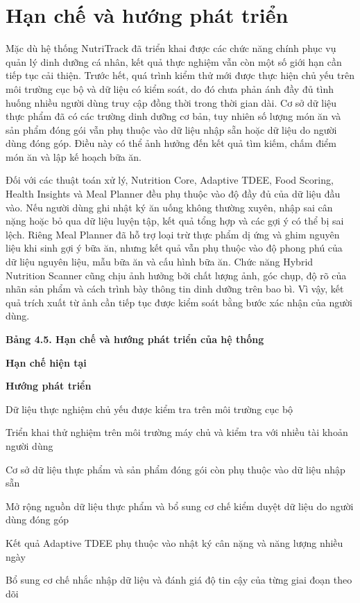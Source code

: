 \documentclass[12pt, a4paper]{report}
\begin{document}
\section{Hạn chế và hướng phát triển}Mặc dù hệ thống NutriTrack đã triển khai được các chức năng chính phục vụ quản lý dinh dưỡng cá nhân, kết quả thực nghiệm vẫn còn một số giới hạn cần tiếp tục cải thiện. Trước hết, quá trình kiểm thử mới được thực hiện chủ yếu trên môi trường cục bộ và dữ liệu có kiểm soát, do đó chưa phản ánh đầy đủ tình huống nhiều người dùng truy cập đồng thời trong thời gian dài. Cơ sở dữ liệu thực phẩm đã có các trường dinh dưỡng cơ bản, tuy nhiên số lượng món ăn và sản phẩm đóng gói vẫn phụ thuộc vào dữ liệu nhập sẵn hoặc dữ liệu do người dùng đóng góp. Điều này có thể ảnh hưởng đến kết quả tìm kiếm, chấm điểm món ăn và lập kế hoạch bữa ăn.

Đối với các thuật toán xử lý, Nutrition Core, Adaptive TDEE, Food Scoring, Health Insights và Meal Planner đều phụ thuộc vào độ đầy đủ của dữ liệu đầu vào. Nếu người dùng ghi nhật ký ăn uống không thường xuyên, nhập sai cân nặng hoặc bỏ qua dữ liệu luyện tập, kết quả tổng hợp và các gợi ý có thể bị sai lệch. Riêng Meal Planner đã hỗ trợ loại trừ thực phẩm dị ứng và ghim nguyên liệu khi sinh gợi ý bữa ăn, nhưng kết quả vẫn phụ thuộc vào độ phong phú của dữ liệu nguyên liệu, mẫu bữa ăn và cấu hình bữa ăn. Chức năng Hybrid Nutrition Scanner cũng chịu ảnh hưởng bởi chất lượng ảnh, góc chụp, độ rõ của nhãn sản phẩm và cách trình bày thông tin dinh dưỡng trên bao bì. Vì vậy, kết quả trích xuất từ ảnh cần tiếp tục được kiểm soát bằng bước xác nhận của người dùng.

\textbf{Bảng 4.5. Hạn chế và hướng phát triển của hệ thống}

\textbf{Hạn chế hiện tại}

\textbf{Hướng phát triển}

Dữ liệu thực nghiệm chủ yếu được kiểm tra trên môi trường cục bộ

Triển khai thử nghiệm trên môi trường máy chủ và kiểm tra với nhiều tài khoản người dùng

Cơ sở dữ liệu thực phẩm và sản phẩm đóng gói còn phụ thuộc vào dữ liệu nhập sẵn

Mở rộng nguồn dữ liệu thực phẩm và bổ sung cơ chế kiểm duyệt dữ liệu do người dùng đóng góp

Kết quả Adaptive TDEE phụ thuộc vào nhật ký cân nặng và năng lượng nhiều ngày

Bổ sung cơ chế nhắc nhập dữ liệu và đánh giá độ tin cậy của từng giai đoạn theo dõi
\end{document}
